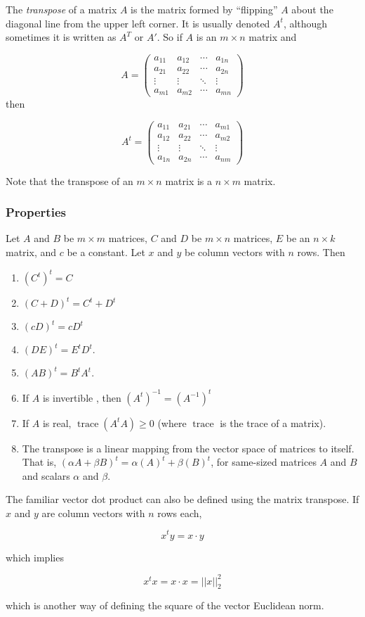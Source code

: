\documentclass{article}
\begin{document}
The \emph{transpose} of a matrix $A$ is the matrix formed by ``flipping'' $A$ about the diagonal line from the upper left corner.  It is usually denoted $A^t$, although sometimes it is written as $A^T$ or $A'$. So if $A$ is an $m \times n$ matrix and

$$
 A = 
\begin{pmatrix}
 a_{11} & a_{12} & \cdots & a_{1n} \\
 a_{21} & a_{22} & \cdots & a_{2n} \\
 \vdots & \vdots & \ddots & \vdots \\
 a_{m1} & a_{m2} & \cdots & a_{mn} 
\end{pmatrix} 
$$
then

$$ A^t =
\begin{pmatrix}
 a_{11} & a_{21} & \cdots & a_{m1} \\
 a_{12} & a_{22} & \cdots & a_{m2} \\
 \vdots & \vdots & \ddots & \vdots \\
 a_{1n} & a_{2n} & \cdots & a_{nm} 
\end{pmatrix} 
$$

Note that the transpose of an $m \times n$ matrix is a $n \times m$ matrix.

\subsubsection*{Properties}

Let $A$ and $B$ be $m \times m$ matrices, $C$ and $D$ be $m\times n$ matrices, $E$ be an $n\times k$ matrix, and $c$ be a constant.  Let $x$ and $y$ be column vectors with $n$ rows. Then

\begin{enumerate}
\item $(C^t)^t = C$
\item $(C+D)^t = C^t + D^t$
\item $(cD)^t = cD^t$
\item $(DE)^t=E^tD^t.$
\item $(AB)^t = B^t A^t.$
\item If $A$ is invertible , then $(A^t)^{-1} = (A^{-1})^t $
\item If $A$ is real, $\operatorname{trace}(A^tA) \ge 0$ (where $\operatorname{trace}$ is the trace of a matrix).
\item The transpose is a linear mapping from the vector space of matrices to itself.  That is, $(\alpha A + \beta B)^t = \alpha (A)^t + \beta (B)^t$, for same-sized matrices $A$ and $B$ and scalars $\alpha$ and $\beta$.
\end{enumerate}

The familiar vector dot product can also be defined using the matrix transpose.  If $x$ and $y$ are column vectors with $n$ rows each, 

$$ x^t y = x \cdot y $$

which implies

$$ x^t x = x \cdot x = ||x||_2^2 $$

which is another way of defining the square of the vector Euclidean norm.
\end{document}
